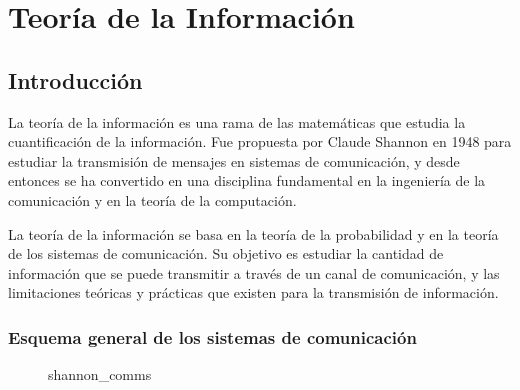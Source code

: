 \section{Teoría de la Información}\label{teoruxeda-de-la-informaciuxf3n}



\subsection{Introducción}\label{introducciuxf3n-teoria-informacion}

La teoría de la información es una rama de las matemáticas que estudia
la cuantificación de la información. Fue propuesta por Claude Shannon en
1948 para estudiar la transmisión de mensajes en sistemas de
comunicación, y desde entonces se ha convertido en una disciplina
fundamental en la ingeniería de la comunicación y en la teoría de la
computación.

La teoría de la información se basa en la teoría de la probabilidad y en
la teoría de los sistemas de comunicación. Su objetivo es estudiar la
cantidad de información que se puede transmitir a través de un canal de
comunicación, y las limitaciones teóricas y prácticas que existen para
la transmisión de información.

\subsubsection{Esquema general de los sistemas de
comunicación}\label{esquema-general-de-los-sistemas-de-comunicaciuxf3n}

\begin{figure}
\centering

\caption{shannon\_comms}
\end{figure}


